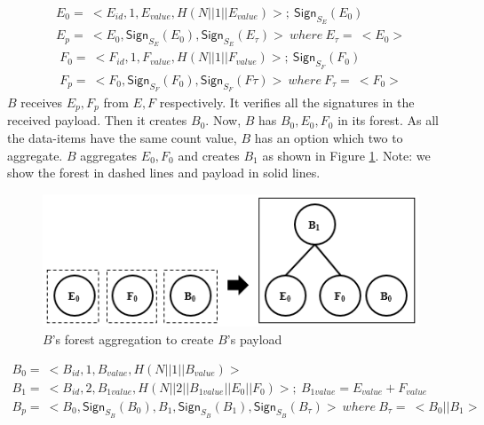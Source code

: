 \begin{exmp}
		\begin{equation}
			\begin{array}{l}
			E_{0} =\ <E_{id}, 1, E_{value}, H(N||1||E_{value})>;\ \textsf{Sign}_{S_{E}}(E_{0})\\
			E_{p} =\ <E_{0}, \textsf{Sign}_{S_{E}}(E_{0}), \textsf{Sign}_{S_{E}}(E_{\tau}) >\ where\ E_{\tau} =\ <E_{0}>
			\end{array}
		\end{equation}
		\begin{equation}
			\begin{array}{l}
				F_{0} =\ <F_{id}, 1, F_{value}, H(N||1||F_{value})>;\ \textsf{Sign}_{S_{F}}(F_{0})\\
				F_{p} =\ <F_{0}, \textsf{Sign}_{S_{F}}(F_{0}), \textsf{Sign}_{S_{F}}(F{\tau}) >\ where\ F_{\tau} =\ <F_{0}> 
			\end{array}
		\end{equation}
		$B$ receives $E_{p},F_{p}$ from $E,F$ respectively. 
		It verifies all the signatures in the received payload.
		Then it creates $B_{0}$.
		Now, $B$ has $B_{0},E_{0},F_{0}$ in its forest. 
		As all the data-items have the same count value, $B$ has an option which two to aggregate.
		$B$ aggregates $E_{0},F_{0}$ and creates $B_{1}$ as shown in Figure \ref{fig:b-forest-payload}.
		Note: we show the forest in dashed lines and payload in solid lines.
		\begin{figure}[h!]
			\centering
			\includegraphics[scale=1]{images/b-forest-payload.png}
			\caption{$B$'s forest aggregation to create $B$'s payload }
			\label{fig:b-forest-payload}
		\end{figure}
		\begin{equation}
			\begin{array}{l}
				B_{0} =\ <B_{id}, 1, B_{value}, H(N||1||B_{value})>\\
				B_{1} =\ < B_{id}, 2, B_{1value}, H(N||2||B_{1value}||E_{0}||F_{0})>;\ B_{1value} = E_{value} + F_{value} \\
				B_{p} =\ < B_{0}, \textsf{Sign}_{S_{B}}(B_{0}), B_{1}, \textsf{Sign}_{S_{B}}(B_{1}), \textsf{Sign}_{S_{B}}(B_{\tau}) >\ where\ B_{\tau} =\ <B_{0} || B_{1}>
			\end{array}
		\end{equation}


\end{exmp}
